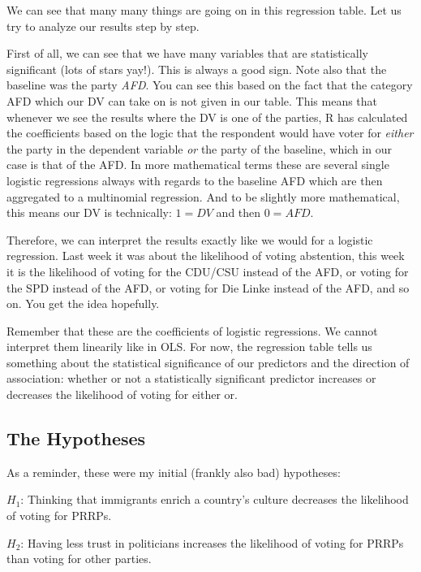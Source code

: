 \documentclass[
  letterpaper,
  DIV=11,
  numbers=noendperiod]{scrreprt}
\begin{document}
We can see that many many things are going on in this regression table.
Let us try to analyze our results step by step.

First of all, we can see that we have many variables that are
statistically significant (lots of stars yay!). This is always a good
sign. Note also that the baseline was the party \emph{AFD}. You can see
this based on the fact that the category AFD which our DV can take on is
not given in our table. This means that whenever we see the results
where the DV is one of the parties, R has calculated the coefficients
based on the logic that the respondent would have voter for
\emph{either} the party in the dependent variable \emph{or} the party of
the baseline, which in our case is that of the AFD. In more mathematical
terms these are several single logistic regressions always with regards
to the baseline AFD which are then aggregated to a multinomial
regression. And to be slightly more mathematical, this means our DV is
technically: \(1 = DV\) and then \(0 = AFD\).

Therefore, we can interpret the results exactly like we would for a
logistic regression. Last week it was about the likelihood of voting
abstention, this week it is the likelihood of voting for the CDU/CSU
instead of the AFD, or voting for the SPD instead of the AFD, or voting
for Die Linke instead of the AFD, and so on. You get the idea hopefully.

Remember that these are the coefficients of logistic regressions. We
cannot interpret them linearily like in OLS. For now, the regression
table tells us something about the statistical significance of our
predictors and the direction of association: whether or not a
statistically significant predictor increases or decreases the
likelihood of voting for either or.

\hypertarget{the-hypotheses}{%
\subsection{The Hypotheses}\label{the-hypotheses}}

As a reminder, these were my initial (frankly also bad) hypotheses:

\begin{center}
$H_1$: Thinking that immigrants enrich a country's culture decreases the likelihood of voting for PRRPs.
\end{center}

\begin{center}
$H_2$: Having less trust in politicians increases the likelihood of voting for PRRPs than voting for other parties.
\end{center}
\end{document}
